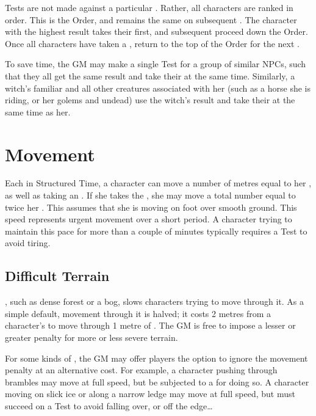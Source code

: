 {\initiative} Tests are not made against a particular {\tn}.
Rather, all characters are ranked in order.
This is the {\initiative} Order, and remains the same on subsequent {\rounds}.
The character with the highest result takes their {\turn} first, and subsequent {\turns} proceed down the {\initiative} Order.
Once all characters have taken a {\turn}, return to the top of the {\initiative} Order for the next {\round}.

To save time, the GM may make a single Test for a group of similar NPCs, such that they all get the same result and take their {\turns} at the same time.
Similarly, a witch's familiar and all other creatures associated with her (such as a horse she is riding, or her golems and undead) use the witch's {\initiative} result and take their {\turns} at the same time as her.

\section{Movement}

Each {\turn} in Structured Time, a character can move a number of metres equal to her , as well as taking an {\action}.
If she takes the  {\action}, she may move a total number equal to twice her .
This assumes that she is moving on foot over smooth ground.
This speed represents urgent movement over a short period.
A character trying to maintain this pace for more than a couple of minutes typically requires a  Test to avoid tiring.



\subsection{Difficult Terrain}

{\difficultterrain}, such as dense forest or a bog, slows characters trying to move through it.
As a simple default, movement through it is halved; it costs 2 metres from a character's  to move through 1 metre of {\difficultterrain}.
The GM is free to impose a lesser or greater penalty for more or less severe terrain.

For some kinds of {\difficultterrain}, the GM may offer players the option to ignore the movement penalty at an alternative cost.
For example, a character pushing through brambles may move at full speed, but be subjected to a {\damagetest} for doing so.
A character moving on slick ice or along a narrow ledge may move at full speed, but must succeed on a  Test to avoid falling over, or off the edge{\dots}

